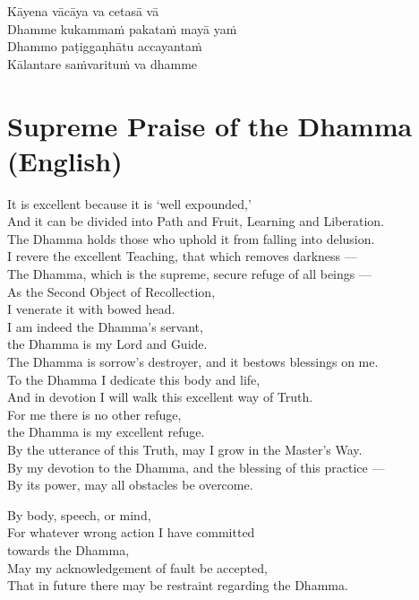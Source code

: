 \clearpage


Kāyena vācāya va cetasā vā\\
Dhamme kukammaṁ pakataṁ mayā yaṁ\\
Dhammo paṭiggaṇhātu accayantaṁ\\
Kālantare saṁvarituṁ va dhamme

\section*{Supreme Praise of the Dhamma (English)}

\begin{leader}
\end{leader}

It is excellent because it is `well expounded,'\\
And it can be divided into Path and Fruit, Learning and Liberation.\\
The Dhamma holds those who uphold it from falling into delusion.\\
I revere the excellent Teaching, that which removes darkness ---\\
The Dhamma, which is the supreme, secure refuge of all beings ---\\
As the Second Object of Recollection,\\\vin I venerate it with bowed head.\\
I am indeed the Dhamma's servant,\\\vin the Dhamma is my Lord and Guide.\\
The Dhamma is sorrow's destroyer, and it bestows blessings on me.\\
To the Dhamma I dedicate this body and life,\\
And in devotion I will walk this excellent way of Truth.\\
For me there is no other refuge,\\\vin the Dhamma is my excellent refuge.\\
By the utterance of this Truth, may I grow in the Master's Way.\\
By my devotion to the Dhamma, and the blessing of this practice ---\\
By its power, may all obstacles be overcome.

\clearpage


By body, speech, or mind,\\
For whatever wrong action I have committed\\\vin towards the Dhamma,\\
May my acknowledgement of fault be accepted,\\
That in future there may be restraint regarding the Dhamma.

